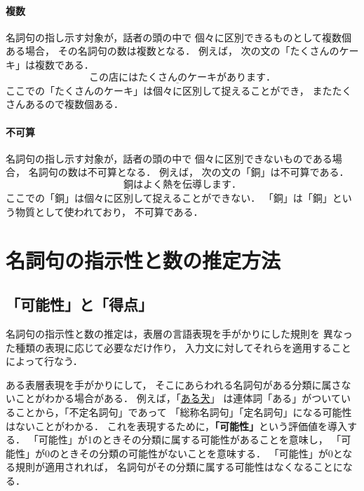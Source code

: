 \paragraph{複数}
名詞句の指し示す対象が，話者の頭の中で
個々に区別できるものとして複数個ある場合，
その名詞句の数は複数となる．
例えば，
次の文の「たくさんのケーキ」は複数である．
\begin{equation}
この店には\underline{たくさんのケーキ}があります．
  \label{eqn:cake_mise}
\end{equation}
ここでの「たくさんのケーキ」は個々に区別して捉えることができ，
またたくさんあるので複数個ある．


\paragraph{不可算}
名詞句の指し示す対象が，話者の頭の中で
個々に区別できないものである場合，
名詞句の数は不可算となる．
例えば，
次の文の「銅」は不可算である．
\begin{equation}
\underline{銅}はよく熱を伝導します．
  \label{eqn:cake_kinou}
\end{equation}
ここでの「銅」は個々に区別して捉えることができない．
「銅」は「銅」という物質として使われており，
不可算である． 
\vspace*{-2mm}


\section{名詞句の指示性と数の推定方法}\label{sec:decide}

\subsection{「可能性」と「得点」}\label{sec:point}

名詞句の指示性と数の推定は，表層の言語表現を手がかりにした規則を
異なった種類の表現に応じて必要なだけ作り，
入力文に対してそれらを適用することによって行なう．

ある表層表現を手がかりにして，
そこにあらわれる名詞句がある分類に属さないことがわかる場合がある．
例えば，「\underline{\.あ\.る犬}」
は連体詞「ある」がついていることから，「不定名詞句」であって
「総称名詞句」「定名詞句」になる可能性はないことがわかる．
これを表現するために，{\bf 「可能性」}という評価値を導入する．
「可能性」が1のときその分類に属する可能性があることを意味し，
「可能性」が0のときその分類の可能性がないことを意味する．
「可能性」が0となる規則が適用されれば，
名詞句がその分類に属する可能性はなくなることになる．

